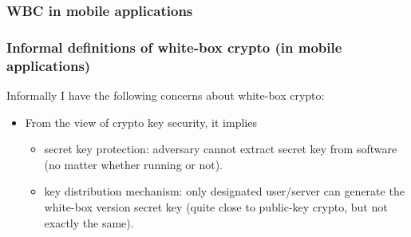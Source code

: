 \documentclass[aspectratio=169,xcolor=dvipsnames]{beamer}
\begin{document}
\frame
{
\frametitle{WBC in mobile applications}
\begin{center}
\end{center}

}

\frame
{
\frametitle{Informal definitions of white-box crypto (in mobile applications)}
Informally I have the following concerns about white-box crypto:
\begin{itemize}
\setlength{\itemsep}{12pt}
\item From the view of crypto key security, it implies
\begin{itemize}
\setlength{\itemsep}{12pt}
\item secret key protection: adversary cannot extract secret key from software (no matter whether running or not).

\item key distribution mechanism: only designated user/server can generate the white-box version secret key (quite close to public-key crypto, but not exactly the same).

\end{itemize}
\end{itemize}
}
\end{document}

